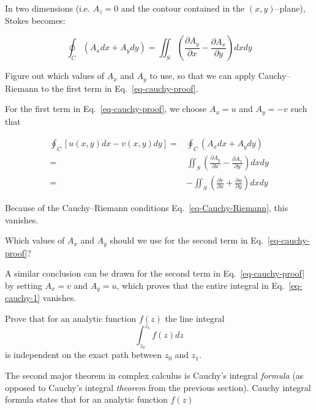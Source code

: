 In two dimensions (i.e. $A_z=0$ and the contour contained in the $(x,y)$--plane), Stokes becomes:

\begin{equation}
\oint_{{C}} \left(A_x dx + A_y dy\right) = \iint_S \left(\frac{\partial
A_y}{\partial x} - \frac{\partial A_x}{\partial y} \right)dx dy
\end{equation} 

\begin{cue}
Figure out which values of $A_x$ and $A_y$ to use, so that we can apply Cauchy--Riemann to the first term in Eq.~\ref{eq-cauchy-proof}.
\end{cue}

For the first term in Eq.~\ref{eq-cauchy-proof}, we choose $A_x=u$ and $A_y=-v$ such that

\begin{align}
\oint_{C}\left[u(x,y)dx-v(x,y)dy\right] =& \oint_{{C}} \left(A_x dx + A_y dy\right) \nonumber \\
=& \iint_S \left(\frac{\partial A_y}{\partial x} - \frac{\partial A_x}{\partial y} \right)dx dy \nonumber \\ =& -\iint_S \left(\frac{\partial v}{\partial x} + \frac{\partial u}{\partial y} \right)dx dy 
\end{align} 

Because of the Cauchy--Riemann conditions Eq.~\ref{eq-Cauchy-Riemann}, this
vanishes.

\begin{cue}
Which values of $A_x$ and $A_y$ should we use for the second term in Eq.~\ref{eq-cauchy-proof}?
\end{cue}

A similar conclusion can be drawn for the second term in Eq.~\ref{eq-cauchy-proof} by setting $A_x=v$ and $A_y=u$, which proves that the entire integral in Eq.~\ref{eq-cauchy-1} vanishes.

\begin{exer}
Prove that for an analytic function $f(z)$ the line integral 
$$\int_{z_0}^{z_1}f(z)dz$$
is independent on the exact path between $z_0$ and $z_1$.
\end{exer}


\pagebreak

\label{week1}

The second major theorem in complex calculus is Cauchy's integral \emph{formula} (as opposed to Cauchy's integral \emph{theorem} from the previous section). Cauchy integral formula states that for an analytic function $f(z)$

